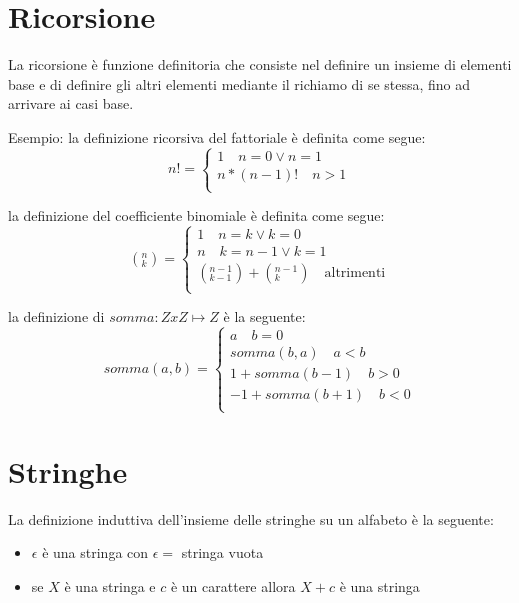 \section{Ricorsione}
La ricorsione è funzione definitoria che consiste nel definire un insieme
di elementi base e di definire gli altri elementi mediante il richiamo di se stessa,
fino ad arrivare ai casi base.

Esempio:
la definizione ricorsiva del fattoriale è definita come segue:
\begin{equation*}
    n! = \begin{cases} 1 \quad n = 0 \lor n = 1 \\ n * (n-1)! \quad n > 1\\
\end{cases}
\end{equation*}

la definizione del coefficiente binomiale è definita come segue:
\begin{equation*}
    (^n _ k) = \begin{cases} 1 \quad n = k \lor k = 0 \\
                             n \quad k = n-1 \lor k = 1 \\
                             (^{n-1} _{k-1}) + (^{n-1} _k) \quad \text{altrimenti} \\
                \end{cases}
\end{equation*}

la definizione di $somma:Z x Z \mapsto Z$ è la seguente:
\begin{equation*}
    somma(a,b) = \begin{cases} a \quad b = 0 \\
                               somma(b,a) \quad a < b \\
                               1 + somma(b-1) \quad b > 0\\
                               -1 + somma(b+1) \quad b < 0 \\
                  \end{cases}
\end{equation*}

\section{Stringhe}
La definizione induttiva dell'insieme delle stringhe su un alfabeto è la seguente:
\begin{itemize}
    \item $\epsilon$ è una stringa con $\epsilon = $ stringa vuota
    \item se $X$ è una stringa e $c$ è un carattere allora $X+c$ è una stringa
\end{itemize}
